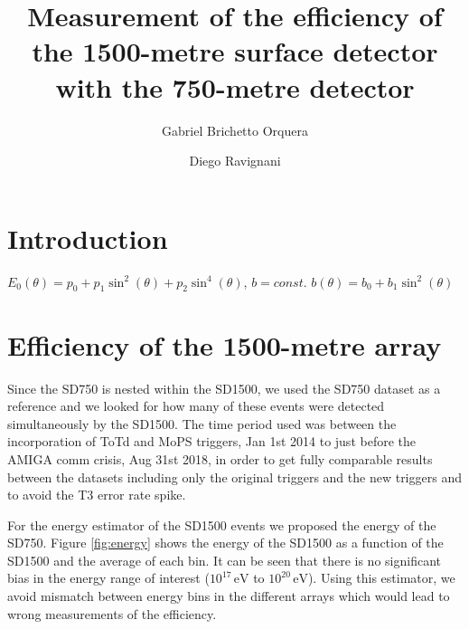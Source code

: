 \documentclass[12pt,a4paper]{article}
\newcommand{\eV}{\, \mathrm{eV}}
\begin{document}

\title{\textbf{Measurement of the efficiency of the 1500-metre surface detector with the 750-metre detector}}



\author{Gabriel Brichetto Orquera}
\author{Diego Ravignani}

\date{\vspace{-2cm}} %

\maketitle



\section{Introduction}





$E_0(\theta)=p_0+p_1\sin^2(\theta)+p_2\sin^4(\theta)$, $b=const.$ $b(\theta)=b_0+b_1\sin^2(\theta)$

\section{Efficiency of the 1500-metre array}
\label{sec:efficiency}

Since the SD750 is nested within the SD1500, we used the SD750 dataset as a reference and we looked for how many of these events were detected simultaneously by the SD1500. The time period used was between the incorporation of ToTd and MoPS triggers, Jan 1st 2014 to just before the AMIGA comm crisis, Aug 31st 2018, in order to get fully comparable results between the datasets including only the original triggers and the new triggers and to avoid the T3 error rate spike.

For the energy estimator of the SD1500 events we proposed the energy of the SD750. Figure \ref{fig:energy} shows the energy of the SD1500 as a function of the SD1500 and the average of each bin. It can be seen that there is no significant bias in the energy range of interest ($10^{17}\eV$ to $10^{20}\eV$). Using this estimator, we avoid mismatch between energy bins in the different arrays which would lead to wrong measurements of the efficiency.
\end{document}
